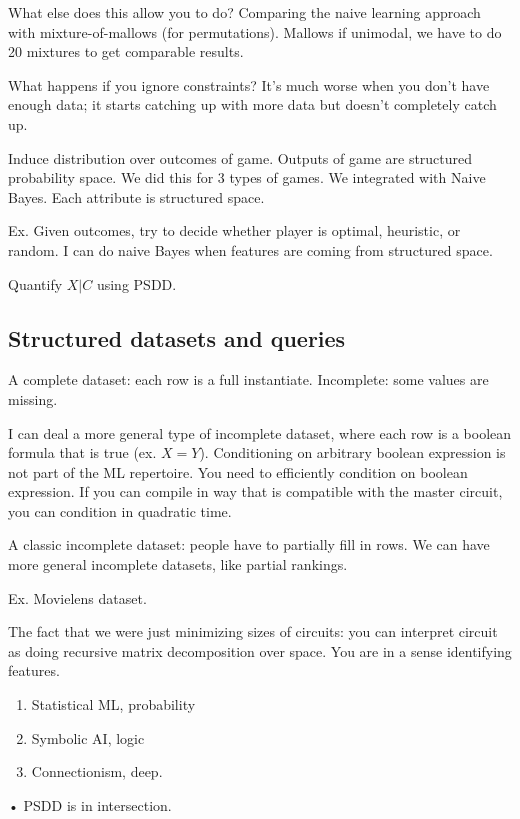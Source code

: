 What else does this allow you to do? Comparing the naive learning approach with mixture-of-mallows (for permutations). Mallows if unimodal, we have to do 20 mixtures to get comparable results.


What happens if you ignore constraints? It's much worse when you don't have enough data; it starts catching up with more data but doesn't completely catch up.

Induce distribution over outcomes of game. Outputs of game are structured probability space. We did this for 3 types of games. We integrated with Naive Bayes. Each attribute is structured space. %

Ex. Given outcomes, try to decide whether player is optimal, heuristic, or random. 
I can do naive Bayes when features are coming from structured space.

Quantify $X|C$ using PSDD.

\subsection{Structured datasets and queries}

A complete dataset: each row is a full instantiate. Incomplete: some values are missing. 

I can deal  a more general type of incomplete dataset, where each row is a boolean formula that is true (ex. $X=Y$). Conditioning on arbitrary boolean expression is not part of the ML repertoire. You need to efficiently condition on boolean expression. If you can compile in way that is compatible with the master circuit, you can condition in quadratic time.

A classic incomplete dataset: people have to partially fill in rows. We can have more general incomplete datasets, like partial rankings.

Ex. Movielens dataset. 

The fact that we were just minimizing sizes of circuits: you can interpret circuit as doing recursive matrix decomposition over space. %
You are in a sense identifying features.

\begin{enumerate}
\item
Statistical ML, probability
\item
Symbolic AI, logic
\item
Connectionism, deep.
\end{enumerate}• 
PSDD is in intersection.

